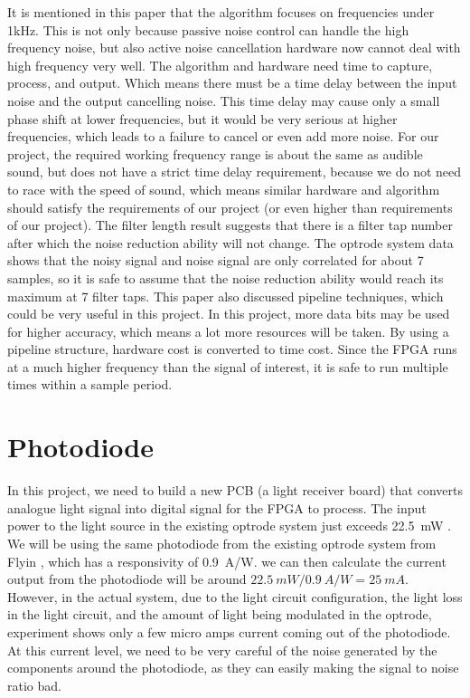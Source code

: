 It is mentioned in this paper that the algorithm focuses on frequencies under 1kHz.  This is not only because passive noise control can handle the high frequency noise, but also active noise cancellation hardware now cannot deal with high frequency very well.  The algorithm and hardware need time to capture, process, and output.  Which means there must be a time delay between the input noise and the output cancelling noise.  This time delay may cause only a small phase shift at lower frequencies, but it would be very serious at higher frequencies, which leads to a failure to cancel or even add more noise.  For our project, the required working frequency range is about the same as audible sound, but does not have a strict time delay requirement, because we do not need to race with the speed of sound, which means similar hardware and algorithm should satisfy the requirements of our project (or even higher than requirements of our project).  The filter length result suggests that there is a filter tap number after which the noise reduction ability will not change.  The optrode system data shows that the noisy signal and noise signal are only correlated for about 7 samples, so it is safe to assume that the noise reduction ability would reach its maximum at 7 filter taps.  This paper also discussed pipeline techniques, which could be very useful in this project.  In this project, more data bits may be used for higher accuracy, which means a lot more resources will be taken.  By using a pipeline structure, hardware cost is converted to time cost.  Since the FPGA runs at a much higher frequency than the signal of interest, it is safe to run multiple times within a sample period.

\section{Photodiode}

In this project, we need to build a new PCB (a light receiver board) that converts analogue light signal into digital signal for the FPGA to process.  The input power to the light source in the existing optrode system just exceeds \qty{22.5}{mW} \cite{OptrodePower}.  We will be using the same photodiode from the existing optrode system from Flyin \cite{Flyin}, which has a responsivity of \qty{0.9}{A/W}.  we can then calculate the current output from the photodiode will be around $\qty{22.5}{mW}/\qty{0.9}{A/W}=\qty{25}{mA}$.  However, in the actual system, due to the light circuit configuration, the light loss in the light circuit, and the amount of light being modulated in the optrode, experiment shows only a few micro amps current coming out of the photodiode.  At this current level, we need to be very careful of the noise generated by the components around the photodiode, as they can easily making the signal to noise ratio bad.

